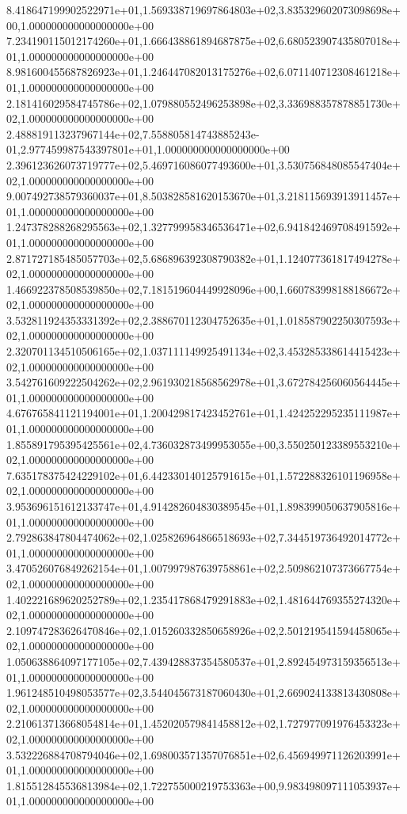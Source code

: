 8.418647199902522971e+01,1.569338719697864803e+02,3.835329602073098698e+00,1.000000000000000000e+00
7.234190115012174260e+01,1.666438861894687875e+02,6.680523907435807018e+01,1.000000000000000000e+00
8.981600455687826923e+01,1.246447082013175276e+02,6.071140712308461218e+01,1.000000000000000000e+00
2.181416029584745786e+02,1.079880552496253898e+02,3.336988357878851730e+02,1.000000000000000000e+00
2.488819113237967144e+02,7.558805814743885243e-01,2.977459987543397801e+01,1.000000000000000000e+00
2.396123626073719777e+02,5.469716086077493600e+01,3.530756848085547404e+02,1.000000000000000000e+00
9.007492738579360037e+01,8.503828581620153670e+01,3.218115693913911457e+01,1.000000000000000000e+00
1.247378288268295563e+02,1.327799958346536471e+02,6.941842469708491592e+01,1.000000000000000000e+00
2.871727185485057703e+02,5.686896392308790382e+01,1.124077361817494278e+02,1.000000000000000000e+00
1.466922378508539850e+02,7.181519604449928096e+00,1.660783998188186672e+02,1.000000000000000000e+00
3.532811924353331392e+02,2.388670112304752635e+01,1.018587902250307593e+02,1.000000000000000000e+00
2.320701134510506165e+02,1.037111149925491134e+02,3.453285338614415423e+02,1.000000000000000000e+00
3.542761609222504262e+02,2.961930218568562978e+01,3.672784256060564445e+01,1.000000000000000000e+00
4.676765841121194001e+01,1.200429817423452761e+01,1.424252295235111987e+01,1.000000000000000000e+00
1.855891795395425561e+02,4.736032873499953055e+00,3.550250123389553210e+02,1.000000000000000000e+00
7.635178375424229102e+01,6.442330140125791615e+01,1.572288326101196958e+02,1.000000000000000000e+00
3.953696151612133747e+01,4.914282604830389545e+01,1.898399050637905816e+01,1.000000000000000000e+00
2.792863847804474062e+02,1.025826964866518693e+02,7.344519736492014772e+01,1.000000000000000000e+00
3.470526076849262154e+01,1.007997987639758861e+02,2.509862107373667754e+02,1.000000000000000000e+00
1.402221689620252789e+02,1.235417868479291883e+02,1.481644769355274320e+02,1.000000000000000000e+00
2.109747283626470846e+02,1.015260332850658926e+02,2.501219541594458065e+02,1.000000000000000000e+00
1.050638864097177105e+02,7.439428837354580537e+01,2.892454973159356513e+01,1.000000000000000000e+00
1.961248510498053577e+02,3.544045673187060430e+01,2.669024133813430808e+02,1.000000000000000000e+00
2.210613713668054814e+01,1.452020579841458812e+02,1.727977091976453323e+02,1.000000000000000000e+00
3.532226884708794046e+02,1.698003571357076851e+02,6.456949971126203991e+01,1.000000000000000000e+00
1.815512845536813984e+02,1.722755000219753363e+00,9.983498097111053937e+01,1.000000000000000000e+00
